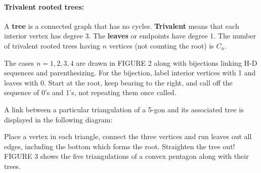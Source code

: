 \documentclass[10pt,]{book}
\newcommand{\terminology}[1]{\textbf{#1}}
\theoremstyle{plain}
\theoremstyle{definition}
\theoremstyle{definition}
\theoremstyle{definition}
\theoremstyle{definition}
\numberwithin{equation}{chapter}
\def\fivegon{%
    \coordinate (a) at (0,2.5);
    \coordinate (b) at (2,1.4);
    \coordinate (c) at (1,0);
    \coordinate (d) at (-.5,0);
    \coordinate (e) at (-2,1.5);
    \draw (a) -- (b) -- (c) -- (d) -- (e) -- (a);
  }
\newcommand{\vtx}[2]{node[fill,circle,inner sep=0pt, minimum size=4pt,label=#1:#2]{}}
\newcommand{\va}[1]{\vtx{above}{#1}}
\newcommand{\vr}[1]{\vtx{right}{#1}}
\newcommand{\vl}[1]{\vtx{left}{#1}}
\renewcommand{\v}{\vtx{above}{}}
\begin{document}
\paragraph[{Trivalent rooted trees:}]{Trivalent rooted trees:}\hypertarget{paragraphs-12}{}
\hypertarget{p-906}{}%
A \terminology{tree} is a connected graph that has no cycles. \terminology{Trivalent} means that each interior vertex has degree 3. The \terminology{leaves} or endpoints have degree 1. The number of trivalent rooted trees having \(n\) vertices (not counting the root) is \(C_n\).%
\par
\hypertarget{p-907}{}%
The cases \(n = 1, 2, 3, 4\) are drawn in FIGURE 2 along with bijections linking H-D sequences and parenthesizing. For the bijection, label interior vertices with 1 and leaves with 0. Start at the root, keep bearing to the right, and call off the sequence of 0's and 1's, not repeating them once called.%
\par
\hypertarget{p-908}{}%
A link between a particular triangulation of a 5-gon and its associated tree is displayed in the following diagram: \begin{sidebyside}{2}{0}{0}{0}
\begin{sbspanel}{0.5}
\end{sbspanel}
\begin{sbspanel}{0.5}
\end{sbspanel}
\end{sidebyside}
 Place a vertex in each triangle, connect the three vertices and run leaves out all edges, including the bottom which forms the root. Straighten the tree out! FIGURE 3 shows the five triangulations of a convex pentagon along with their trees.%
\typeout{************************************************}
\typeout{************************************************}
\end{document}
